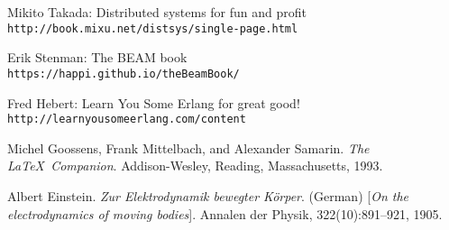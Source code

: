 \begin{thebibliography}{99}
Mikito Takada: Distributed systems for fun and profit
\\\texttt{http://book.mixu.net/distsys/single-page.html}

Erik Stenman: The BEAM book
\\\texttt{https://happi.github.io/theBeamBook/}

Fred Hebert: Learn You Some Erlang for great good!
\\\texttt{http://learnyousomeerlang.com/content}

Michel Goossens, Frank Mittelbach, and Alexander Samarin. 
\textit{The \LaTeX\ Companion}. 
Addison-Wesley, Reading, Massachusetts, 1993.
 
Albert Einstein. 
\textit{Zur Elektrodynamik bewegter K{\"o}rper}. (German) 
[\textit{On the electrodynamics of moving bodies}]. 
Annalen der Physik, 322(10):891–921, 1905.
\end{thebibliography}